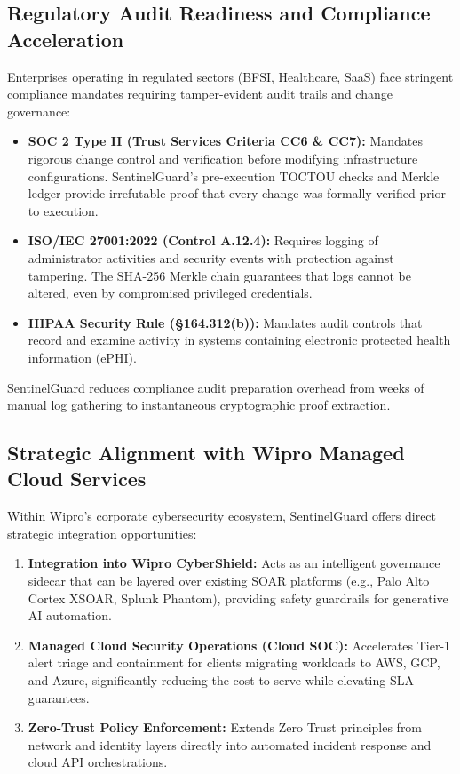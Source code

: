 \documentclass[12pt,a4paper]{report}
\begin{document}
\subsection{Regulatory Audit Readiness and Compliance Acceleration}
Enterprises operating in regulated sectors (BFSI, Healthcare, SaaS) face stringent compliance mandates requiring tamper-evident audit trails and change governance:
\begin{itemize}
    \item \textbf{SOC 2 Type II (Trust Services Criteria CC6 \& CC7):} Mandates rigorous change control and verification before modifying infrastructure configurations. SentinelGuard's pre-execution TOCTOU checks and Merkle ledger provide irrefutable proof that every change was formally verified prior to execution.
    \item \textbf{ISO/IEC 27001:2022 (Control A.12.4):} Requires logging of administrator activities and security events with protection against tampering. The SHA-256 Merkle chain guarantees that logs cannot be altered, even by compromised privileged credentials.
    \item \textbf{HIPAA Security Rule (§164.312(b)):} Mandates audit controls that record and examine activity in systems containing electronic protected health information (ePHI).
\end{itemize}
SentinelGuard reduces compliance audit preparation overhead from weeks of manual log gathering to instantaneous cryptographic proof extraction.

\subsection{Strategic Alignment with Wipro Managed Cloud Services}
Within Wipro's corporate cybersecurity ecosystem, SentinelGuard offers direct strategic integration opportunities:
\begin{enumerate}
    \item \textbf{Integration into Wipro CyberShield:} Acts as an intelligent governance sidecar that can be layered over existing SOAR platforms (e.g., Palo Alto Cortex XSOAR, Splunk Phantom), providing safety guardrails for generative AI automation.
    \item \textbf{Managed Cloud Security Operations (Cloud SOC):} Accelerates Tier-1 alert triage and containment for clients migrating workloads to AWS, GCP, and Azure, significantly reducing the cost to serve while elevating SLA guarantees.
    \item \textbf{Zero-Trust Policy Enforcement:} Extends Zero Trust principles from network and identity layers directly into automated incident response and cloud API orchestrations.
\end{enumerate}
\end{document}
